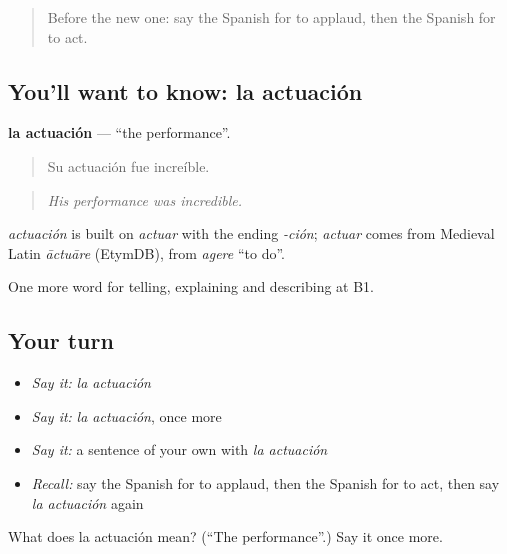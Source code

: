 \label{lesson:ES-C759-actuacion}



\begin{quote}
Before the new one: say the Spanish for to applaud, then the Spanish for to act.
\end{quote}

\subsection*{You'll want to know: la actuación}
\textbf{la actuación} — \textquotedblleft{}the performance\textquotedblright{}.

\begin{quote}
Su actuación fue increíble.
\end{quote}

\begin{quote}
\emph{His performance was incredible.}
\end{quote}

\begin{cousinweb}
\emph{actuación} is built on \emph{actuar} with the ending \emph{-ción}; \emph{actuar} comes from Medieval Latin \emph{āctuāre} (EtymDB), from \emph{agere} \textquotedblleft{}to do\textquotedblright{}.
\end{cousinweb}

\begin{grammarlens}[title={What you've built}]
One more word for telling, explaining and describing at B1.
\end{grammarlens}

\subsection*{Your turn}
\begin{itemize}
\raggedright
  \item \emph{Say it:} \emph{la actuación}
  \item \emph{Say it:} \emph{la actuación}, once more
  \item \emph{Say it:} a sentence of your own with \emph{la actuación}
  \item \emph{Recall:} say the Spanish for to applaud, then the Spanish for to act, then say \emph{la actuación} again
\end{itemize}

\begin{tcolorbox}[breakable,colback=teal!4,colframe=teal!35!black,title={Before you move on}]
What does la actuación mean? (\textquotedblleft{}The performance\textquotedblright{}.) Say it once more.
\end{tcolorbox}
